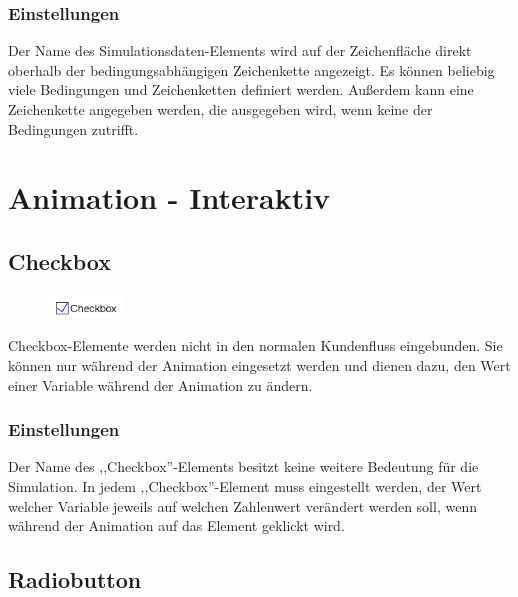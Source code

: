 \subsection*{Einstellungen}

Der Name des Simulationsdaten-Elements wird auf der Zeichenfläche direkt oberhalb der bedingungsabhängigen Zeichenkette angezeigt.
Es können beliebig viele Bedingungen und Zeichenketten definiert werden.
Außerdem kann eine Zeichenkette angegeben werden, die ausgegeben wird, wenn keine der Bedingungen zutrifft.





\chapter{Animation - Interaktiv}

\section{Checkbox}
\label{ref:ModelElementInteractiveCheckbox}

\begin{figure}
\vspace{-22pt}
\includegraphics[width=2cm]{imageModelElementInteractiveCheckbox.png}
\vspace{-22pt}
\end{figure}

Checkbox-Elemente werden nicht in den normalen Kundenfluss eingebunden.
Sie können nur während der Animation eingesetzt werden und dienen dazu,
den Wert einer Variable während der Animation zu ändern.

\subsection*{Einstellungen}

Der Name des ,,Checkbox''-Elements besitzt keine weitere Bedeutung für die Simulation.
In jedem ,,Checkbox''-Element muss eingestellt werden, der Wert welcher Variable
jeweils auf welchen Zahlenwert verändert werden soll, wenn während der Animation
auf das Element geklickt wird.


\section{Radiobutton}
\label{ref:ModelElementInteractiveRadiobutton}

